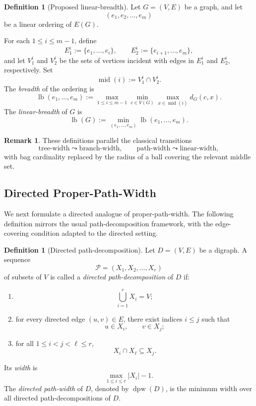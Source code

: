 \documentclass[10pt]{book}
\theoremstyle{definition}
\newtheorem{remark}[theorem]{Remark}
\newtheorem{definition}[theorem]{Definition}
\begin{document}
\begin{definition}[Proposed linear-breadth]
Let \(G=(V,E)\) be a graph, and let
\[
(e_1,e_2,\dots,e_m)
\]
be a linear ordering of \(E(G)\).

For each \(1\le i\le m-1\), define
\[
E_1^i:=\{e_1,\dots,e_i\},
\qquad
E_2^i:=\{e_{i+1},\dots,e_m\},
\]
and let \(V_1^i\) and \(V_2^i\) be the sets of vertices incident with edges in \(E_1^i\) and \(E_2^i\), respectively.
Set
\[
\operatorname{mid}(i):=V_1^i\cap V_2^i.
\]
The \emph{breadth} of the ordering is
\[
\operatorname{lb}(e_1,\dots,e_m):=
\max_{1\le i\le m-1}
\min_{c\in V(G)}
\max_{x\in \operatorname{mid}(i)} d_G(c,x).
\]
The \emph{linear-breadth} of \(G\) is
\[
\operatorname{lb}(G):=
\min_{(e_1,\dots,e_m)} \operatorname{lb}(e_1,\dots,e_m).
\]
\end{definition}

\begin{remark}
These definitions parallel the classical transitions
\[
\text{tree-width} \leadsto \text{branch-width},
\qquad
\text{path-width} \leadsto \text{linear-width},
\]
with bag cardinality replaced by the radius of a ball covering the relevant middle set.
\end{remark}

\subsection{Directed Proper-Path-Width}

We next formulate a directed analogue of proper-path-width.
The following definition mirrors the usual path-decomposition framework, with the edge-covering condition adapted to the directed setting.

\begin{definition}[Directed path-decomposition]
Let \(D=(V,E)\) be a digraph.
A sequence
\[
\mathcal{P}=(X_1,X_2,\dots,X_r)
\]
of subsets of \(V\) is called a \emph{directed path-decomposition} of \(D\) if:
\begin{enumerate}
    \item
    \[
    \bigcup_{i=1}^r X_i=V;
    \]
    \item for every directed edge \((u,v)\in E\), there exist indices \(i\le j\) such that
    \[
    u\in X_i,
    \qquad
    v\in X_j;
    \]
    \item for all \(1\le i<j<\ell\le r\),
    \[
    X_i\cap X_\ell\subseteq X_j.
    \]
\end{enumerate}
Its \emph{width} is
\[
\max_{1\le i\le r}|X_i|-1.
\]
The \emph{directed path-width} of \(D\), denoted by \(\operatorname{dpw}(D)\), is the minimum width over all directed path-decompositions of \(D\).
\end{definition}
\end{document}
